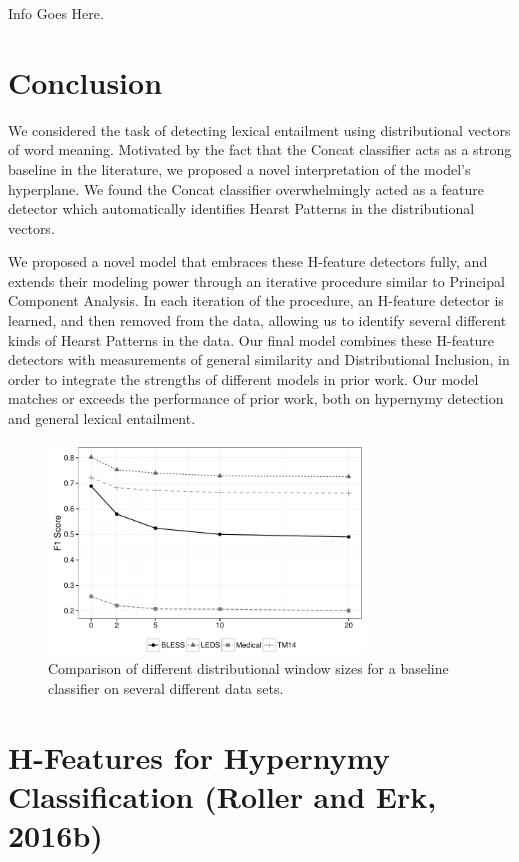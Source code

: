 Info Goes Here.

\section{Conclusion}

We considered the task of detecting lexical entailment using distributional
vectors of word meaning.  Motivated by the fact that the Concat classifier acts
as a strong baseline in the literature, we proposed a novel interpretation of
the model's hyperplane. We found the Concat classifier overwhelmingly acted as
a feature detector which automatically identifies Hearst Patterns in the
distributional vectors.

We proposed a novel model that embraces these H-feature detectors fully, and
extends their modeling power through an iterative procedure similar to
Principal Component Analysis. In each iteration of the procedure, an H-feature
detector is learned, and then removed from the data, allowing us to identify
several different kinds of Hearst Patterns in the data. Our final model
combines these H-feature detectors with measurements of general similarity and
Distributional Inclusion, in order to integrate the strengths of different
models in prior work. Our model matches or exceeds the performance of prior
work, both on hypernymy detection and general lexical entailment.


\hardline

\hardline

\hardline

\begin{figure}
  \centering
  \includegraphics[width=0.75\textwidth]{plots/window.pdf}
  \caption{Comparison of different distributional window sizes for a baseline
  classifier on several different data sets.}
\end{figure}


\section{H-Features for Hypernymy Classification (Roller and Erk, 2016b)}
\label{sec:hfeatures}


